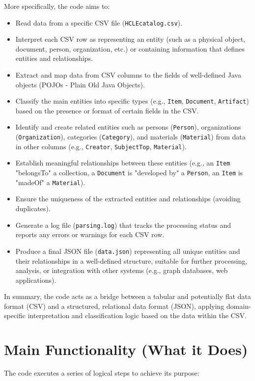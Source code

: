 \documentclass[11pt, a4paper]{article}
\begin{document}
More specifically, the code aims to:
\begin{itemize}
    \item Read data from a specific CSV file (\texttt{HCLEcatalog.csv}).
    \item Interpret each CSV row as representing an entity (such as a physical object, document, person, organization, etc.) or containing information that defines entities and relationships.
    \item Extract and map data from CSV columns to the fields of well-defined Java objects (POJOs - Plain Old Java Objects).
    \item Classify the main entities into specific types (e.g., \texttt{Item}, \texttt{Document}, \texttt{Artifact}) based on the presence or format of certain fields in the CSV.
    \item Identify and create related entities such as persons (\texttt{Person}), organizations (\texttt{Organization}), categories (\texttt{Category}), and materials (\texttt{Material}) from data in other columns (e.g., \texttt{Creator}, \texttt{SubjectTop}, \texttt{Material}).
    \item Establish meaningful relationships between these entities (e.g., an \texttt{Item} "belongsTo" a collection, a \texttt{Document} is "developed by" a \texttt{Person}, an \texttt{Item} is "madeOf" a \texttt{Material}).
    \item Ensure the uniqueness of the extracted entities and relationships (avoiding duplicates).
    \item Generate a log file (\texttt{parsing.log}) that tracks the processing status and reports any errors or warnings for each CSV row.
    \item Produce a final JSON file (\texttt{data.json}) representing all unique entities and their relationships in a well-defined structure, suitable for further processing, analysis, or integration with other systems (e.g., graph databases, web applications).
\end{itemize}
In summary, the code acts as a bridge between a tabular and potentially flat data format (CSV) and a structured, relational data format (JSON), applying domain-specific interpretation and classification logic based on the data within the CSV.

\section{Main Functionality (What it Does)}
The code executes a series of logical steps to achieve its purpose:
\end{document}
